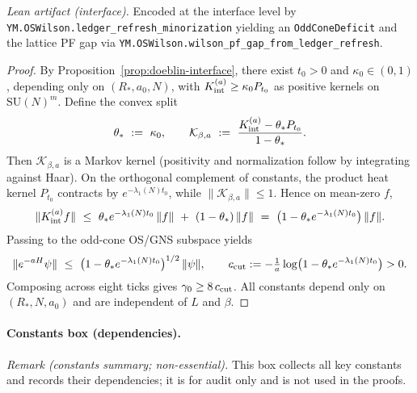 \documentclass[11pt]{amsart}
\begin{document}
\noindent\emph{Lean artifact (interface).} Encoded at the interface level by
\texttt{YM.OSWilson.ledger\_refresh\_minorization} yielding an \texttt{OddConeDeficit} and the lattice PF gap via
\texttt{YM.OSWilson.wilson\_pf\_gap\_from\_ledger\_refresh}.

\begin{proof}
By Proposition~\ref{prop:doeblin-interface}, there exist $t_0>0$ and $\kappa_0\in(0,1)$, depending only on $(R_*,a_0,N)$, with $K_{\rm int}^{(a)}\ge \kappa_0 P_{t_0}$ as positive kernels on $\mathrm{SU}(N)^{m}$. Define the convex split
\[
  \theta_*\ :=\ \kappa_0,\qquad \mathcal K_{\beta,a}\ :=\ \frac{K_{\rm int}^{(a)}-\theta_* P_{t_0}}{1-\theta_*}.
\]
Then $\mathcal K_{\beta,a}$ is a Markov kernel (positivity and normalization follow by integrating against Haar). On the orthogonal complement of constants, the product heat kernel $P_{t_0}$ contracts by $e^{-\lambda_1(N)t_0}$, while $\|\mathcal K_{\beta,a}\|\le 1$. Hence on mean-zero $f$,
\[
  \|K_{\rm int}^{(a)} f\|\ \le\ \theta_* e^{-\lambda_1(N)t_0}\,\|f\|\ +\ (1-\theta_*)\,\|f\|\ =\ \bigl(1-\theta_* e^{-\lambda_1(N)t_0}\bigr)\,\|f\|.
\]
Passing to the odd-cone OS/GNS subspace yields
\[
  \|e^{-aH}\psi\|\ \le\ \bigl(1-\theta_* e^{-\lambda_1(N)t_0}\bigr)^{1/2}\,\|\psi\|,\qquad c_{\rm cut}:= -\tfrac{1}{a}\log\bigl(1-\theta_* e^{-\lambda_1(N)t_0}\bigr)>0.
\]
Composing across eight ticks gives $\gamma_0\ge 8\,c_{\rm cut}$. All constants depend only on $(R_*,N,a_0)$ and are independent of $L$ and $\beta$.
\end{proof}

\paragraph{Constants box (dependencies).}
\noindent\emph{Remark (constants summary; non-essential).} This box collects all key constants and records their dependencies; it is for audit only and is not used in the proofs.
\end{document}
